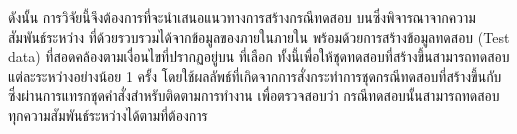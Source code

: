 ดังนั้น การวิจัยนี้จึงต้องการที่จะนำเสนอแนวทางการสร้างกรณีทดสอบ บน{\TestPath}ซึ่งพิจารณาจากความสัมพันธ์ระหว่าง{\softwareComponent} 
ที่ด้วยรวบรวมได้จากข้อมูล{\StaticInformation}ของ{\sourcecode}ภายใน{\Package}ภายใน{\SUT} พร้อมด้วยการสร้างข้อมูลทดสอบ (Test data) 
ที่สอดคล้องตามเงื่อนไขที่ปรากฏอยู่บน{\TestPath} ที่เลือก ทั้งนี้เพื่อให้ชุดทดสอบที่สร้างขึ้นสามารถทดสอบแต่ละ{\Path}ระหว่าง{\softwareComponent}อย่างน้อย 1 ครั้ง
โดยใช้ผลลัพธ์ที่เกิดจากการสั่งกระทำการชุดกรณีทดสอบที่สร้างขึ้นกับ{\sourcecode}ซึ่งผ่านการแทรกชุดคำสั่งสำหรับติดตามการทำงาน 
เพื่อตรวจสอบว่า กรณีทดสอบนั้นสามารถทดสอบทุกความสัมพันธ์ระหว่าง{\softwareComponent}ได้ตามที่ต้องการ
